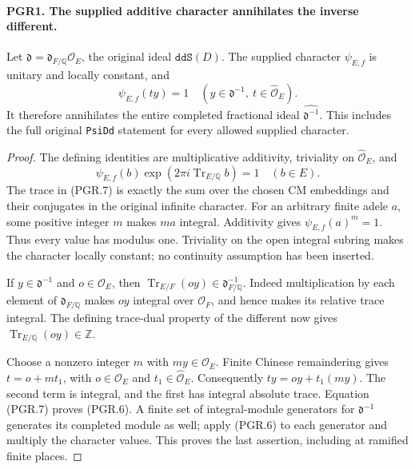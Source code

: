 \paragraph{PGR1. The supplied additive character annihilates the inverse different.}
\label{claim:PGR1}
Let \(\mathfrak d=\mathfrak d_{F/\mathbb Q}\mathcal O_E\), the
original ideal \(\texttt{ddS}(D)\).  The supplied character
\(\psi_{E,f}\) is unitary and locally constant, and
\[
       \psi_{E,f}(t y)=1
       \quad(y\in\mathfrak d^{-1},\ t\in\widehat{\mathcal O}_E).
\tag{PGR.6}
\]
It therefore annihilates the entire completed fractional ideal
\(\widehat{\mathfrak d^{-1}}\).  This includes the full original
\texttt{PsiDd} statement for every allowed supplied character.
\begin{proof}
The defining identities are multiplicative additivity, triviality on
\(\widehat{\mathcal O}_E\), and
\[
 \psi_{E,f}(b)\exp(2\pi i\operatorname{Tr}_{E/\mathbb Q}b)=1
                         \quad(b\in E).
\tag{PGR.7}
\]
The trace in (PGR.7) is exactly the sum over the chosen CM embeddings
and their conjugates in the original infinite character.  For an
arbitrary finite adele \(a\), some positive integer \(m\) makes
\(ma\) integral.  Additivity gives \(\psi_{E,f}(a)^m=1\).
Thus every value has modulus one.  Triviality on the open integral
subring makes the character locally constant; no continuity assumption
has been inserted.

If \(y\in\mathfrak d^{-1}\) and \(o\in\mathcal O_E\), then
\(\operatorname{Tr}_{E/F}(oy)\in\mathfrak d_{F/\mathbb Q}^{-1}\).
Indeed multiplication by each element of \(\mathfrak d_{F/\mathbb Q}\)
makes \(oy\) integral over \(\mathcal O_F\), and hence makes its
relative trace integral.  The defining trace-dual property of the
different now gives
\(\operatorname{Tr}_{E/\mathbb Q}(oy)\in\mathbb Z\).

Choose a nonzero integer \(m\) with \(my\in\mathcal O_E\).
Finite Chinese remaindering gives
\(t=o+mt_1\), with \(o\in\mathcal O_E\) and
\(t_1\in\widehat{\mathcal O}_E\).  Consequently
\(ty=oy+t_1(my)\).  The second term is integral, and the first
has integral absolute trace.  Equation (PGR.7) proves (PGR.6).
A finite set of integral-module generators for
\(\mathfrak d^{-1}\) generates its completed module as well;
apply (PGR.6) to each generator and multiply the character values.
This proves the last assertion, including at ramified finite places.
\end{proof}

